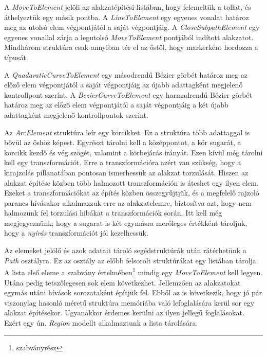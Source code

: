 \documentclass[12pt]{report}
\theoremstyle{definition}
\newcommand{\func}[1]{{\textsl{#1}}}
\begin{document}
A \func{MoveToElement} jelöli az alakzatépítési-listában, hogy felemeltük a
tollat, és áthelyeztük egy másik pontba. A \func{LineToElement} egy egyenes
vonalat határoz meg az utolsó elem végpontjától a saját végpontjáig. A
\func{CloseSubpathElement} egy egyenes vonallal zárja a legutolsó
\func{MoveToElement} pontjából indított alakzatot. Mindhárom struktúra csak
annyiban tér el az őstől, hogy markerként hordozza a típusát.

A \func{QuadaraticCurveToElement} egy másodrendű Bézier görbét határoz meg az
előző elem végpontjától a saját végpontjáig az újabb adattagként megjelenő
kontrollpont szerint. A \func{BezierCurveToElement} egy harmadrendű
Bézier görbét határoz meg az előző elem végpontjától a saját végpontjáig a két
újabb adattagként megjelenő kontrollpontok szerint.

Az \func{ArcElement} struktúra leír egy körcikket. Ez a struktúra több
adattaggal is bővül az őshöz képest. Egyrészt tárolni kell a középpontot, a kör
sugarát, a körcikk kezdő és vég szögét, valamint a körbejárás irányát. Ezen
kívül még tárolni kell egy transzformációt. Erre a transzformációra azért van
szükség, hogy a kirajzolás pillanatában pontosan ismerhessük az alakzat
torzulását. Hiszen az alakzat építése közben több halmozott transzformáción is
áteshet egy ilyen elem. Ezeket a transzformációkat az építés közben
összegyűjtjük, és a megfelelő rajzoló parancs hívásakor alkalmazzuk erre az
alakzatelemre, biztosítva azt, hogy nem halmozunk fel torzulási hibákat a
transzformációk során. Itt kell még megjegyeznünk, hogy a sugarat is két
egymásra merőleges értékként tároljuk, hogy a \emph{nyírás} transzformációt jól
kezelhessük.

Az elemeket jelölő és azok adatait tároló segédstruktúrák után rátérhetünk a
\func{Path} osztályra. Ez az osztály az előbb felsorolt struktúrákat egy
listában tárolja. A lista első eleme a szabvány
értelmében\footnote{szabványrész} mindig egy \func{MoveToElement} kell legyen.
Utána pedig tetszőlegesen sok elem következhet. Jellemzően az alakzatokat
egymás utáni hívások sorozataként építjük fel. Ebből az is következik, hogy jó
pár viszonylag hasonló méretű struktúra memóriába való lefoglalására kerül sor
egy alakzat építésekor. Ugyanakkor érdemes kerülni az ilyen jellegű
foglalásokat. Ezért egy ún. \emph{Region} modellt alkalmaztunk a lista
tárolására.
\end{document}
